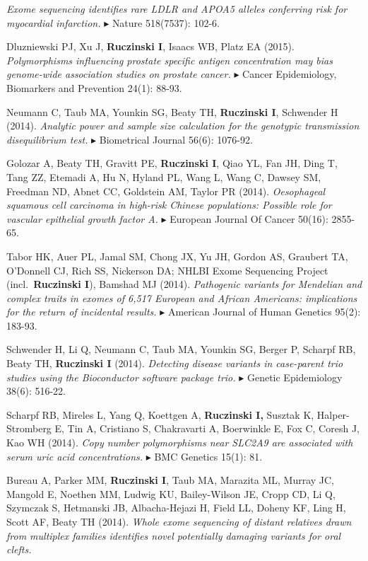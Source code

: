 \documentclass[10pt]{article}
\newcommand{\mine}{
  \addtocounter{enumi}{1}
\item[\fcolorbox{white}{grey}{\color{white} \tiny \arabic{enumi}}]
}
\newcommand{\dg}[1]{{\color{black} $\blacktriangleright$ {#1}}}
\begin{document}
{\it Exome sequencing identifies rare LDLR and APOA5 alleles conferring risk for myocardial infarction.}
\dg{Nature 518(7537): 102-6.} 
\item 
Dluzniewski PJ, Xu J, {\bf Ruczinski I}, Isaacs WB, Platz EA (2015).
{\it Polymorphisms influencing prostate specific antigen concentration may bias genome-wide association studies on prostate cancer.}
\dg{Cancer Epidemiology, Biomarkers and Prevention 24(1): 88-93.}
\item 
Neumann C, Taub MA, Younkin SG, Beaty TH, {\bf Ruczinski I}, Schwender H (2014).
{\it Analytic power and sample size calculation for the genotypic transmission disequilibrium test.}
\dg{Biometrical Journal 56(6): 1076-92.}
\item
Golozar A, Beaty TH, Gravitt PE, {\bf Ruczinski I}, Qiao YL, Fan JH, Ding T, Tang ZZ, Etemadi A, Hu N, Hyland PL, Wang L, Wang C, Dawsey SM, Freedman ND, Abnet CC, Goldstein AM, Taylor PR (2014).
{\it Oesophageal squamous cell carcinoma in high-risk Chinese populations: Possible role for vascular epithelial growth factor A.}
\dg{European Journal Of Cancer 50(16): 2855-65.}
\item
Tabor HK, Auer PL, Jamal SM, Chong JX, Yu JH, Gordon AS, Graubert TA, O'Donnell CJ, Rich SS, Nickerson DA; NHLBI Exome Sequencing Project (incl.~{\bf Ruczinski I}), Bamshad MJ (2014).
{\it Pathogenic variants for Mendelian and complex traits in exomes of 6,517 European and African Americans: implications for the return of incidental results.}
\dg{American Journal of Human Genetics 95(2): 183-93.} 
\mine 
Schwender H, Li Q, Neumann C, Taub MA, Younkin SG, Berger P, Scharpf RB, Beaty TH, {\bf Ruczinski I} (2014).
{\it Detecting disease variants in case-parent trio studies using the Bioconductor software package trio.}
\dg{Genetic Epidemiology 38(6): 516-22.}
\item 
Scharpf RB, Mireles L, Yang Q, Koettgen A, {\bf Ruczinski I,} Susztak K, Halper-Stromberg E, Tin A, Cristiano S, Chakravarti A, Boerwinkle E, Fox C, Coresh J, Kao WH (2014).
{\it Copy number polymorphisms near SLC2A9 are associated with serum uric acid concentrations.}
\dg{BMC Genetics 15(1): 81.}
\item 
Bureau A, Parker MM, {\bf Ruczinski I}, Taub MA, Marazita ML, Murray JC, Mangold E, Noethen MM, Ludwig KU, Bailey-Wilson JE, Cropp CD, Li Q, Szymczak S, Hetmanski JB, Albacha-Hejazi H, Field LL, Doheny KF, Ling H, Scott AF, Beaty TH (2014).
{\it Whole exome sequencing of distant relatives drawn from multiplex families identifies novel potentially damaging variants for oral clefts.}
\end{document}
